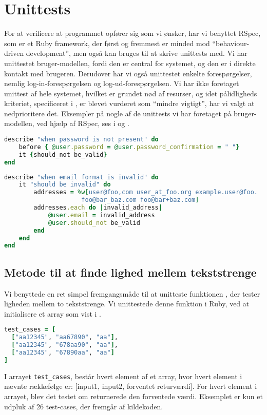 \section{Unittests}
\label{sec:unittests}
For at verificere at programmet opfører sig som vi ønsker, har vi benyttet RSpec, som er et Ruby framework, der først og fremmest er minded mod ``behaviour-driven development'', men også kan bruges til at skrive unittests med. Vi har unittestet bruger-modellen, fordi den er central for systemet, og den er i direkte kontakt med brugeren. Derudover har vi også unittestet enkelte forespørgelser, nemlig log-in-forespørgelsen og log-ud-forespørgelsen. Vi har ikke foretaget unittest af hele systemet, hvilket er grundet nød af resurser, og idet pålidligheds kriteriet, specificeret i , er blevet vurderet som ``mindre vigtigt'', har vi valgt at nedprioritere det. Eksempler på nogle af de unittests vi har foretaget på bruger-modellen, ved hjælp af RSpec, ses i  og .

\begin{lstlisting}[caption={Et eksempel på unittesting af, om brugeren har indtastet et password, når han/hun opretter sig som bruger},label=lst:password,language=Ruby]
describe "when password is not present" do
    before { @user.password = @user.password_confirmation = " "}
    it {should_not be_valid}
end
\end{lstlisting}

\begin{lstlisting}[caption={Et eksempel på unittesting af, om en brugers email er valid, når han/hun opretter sig som bruger},label=lst:email,language=Ruby]
describe "when email format is invalid" do
	it "should be invalid" do
    	addresses = %w[user@foo,com user_at_foo.org example.user@foo.
                 	 foo@bar_baz.com foo@bar+baz.com]
    	addresses.each do |invalid_address|
    		@user.email = invalid_address
        	@user.should_not be_valid
    	end
    end
end
\end{lstlisting}

\subsection{Metode til at finde lighed mellem tekststrenge}
Vi benyttede en ret simpel fremgangsmåde til at unitteste funktionen , der tester ligheden mellem to tekststrenge. Vi unittestede denne funktion i Ruby, ved at initialisere et array som vist i .

\begin{lstlisting}[caption={Et eksempel på en række testcases til brug ved unittesting.},label=lst:testcases,language=Ruby]
test_cases = [
  ["aa12345", "aa67890", "aa"],
  ["aa12345", "678aa90", "aa"],
  ["aa12345", "67890aa", "aa"]
]
\end{lstlisting}

I arrayet \texttt{test\_cases}, består hvert element af et array, hvor hvert element i nævnte rækkefølge er: [input1, input2, forventet returværdi].
For hvert element i arrayet, blev det testet om  returnerede den forventede værdi. Eksemplet er kun et udpluk af 26 test-cases, der fremgår af kildekoden.
